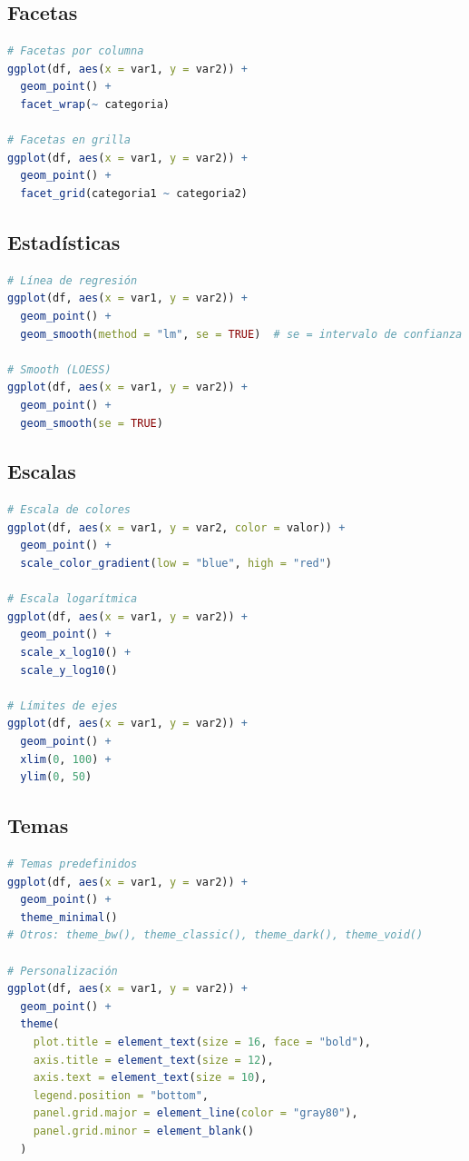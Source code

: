 \documentclass[a4paper,11pt]{article}
\begin{document}
\subsection{Facetas}

\begin{lstlisting}[language=R]
# Facetas por columna
ggplot(df, aes(x = var1, y = var2)) +
  geom_point() +
  facet_wrap(~ categoria)

# Facetas en grilla
ggplot(df, aes(x = var1, y = var2)) +
  geom_point() +
  facet_grid(categoria1 ~ categoria2)
\end{lstlisting}

\subsection{Estadísticas}

\begin{lstlisting}[language=R]
# Línea de regresión
ggplot(df, aes(x = var1, y = var2)) +
  geom_point() +
  geom_smooth(method = "lm", se = TRUE)  # se = intervalo de confianza

# Smooth (LOESS)
ggplot(df, aes(x = var1, y = var2)) +
  geom_point() +
  geom_smooth(se = TRUE)
\end{lstlisting}

\subsection{Escalas}

\begin{lstlisting}[language=R]
# Escala de colores
ggplot(df, aes(x = var1, y = var2, color = valor)) +
  geom_point() +
  scale_color_gradient(low = "blue", high = "red")

# Escala logarítmica
ggplot(df, aes(x = var1, y = var2)) +
  geom_point() +
  scale_x_log10() +
  scale_y_log10()

# Límites de ejes
ggplot(df, aes(x = var1, y = var2)) +
  geom_point() +
  xlim(0, 100) +
  ylim(0, 50)
\end{lstlisting}

\subsection{Temas}

\begin{lstlisting}[language=R]
# Temas predefinidos
ggplot(df, aes(x = var1, y = var2)) +
  geom_point() +
  theme_minimal()
# Otros: theme_bw(), theme_classic(), theme_dark(), theme_void()

# Personalización
ggplot(df, aes(x = var1, y = var2)) +
  geom_point() +
  theme(
    plot.title = element_text(size = 16, face = "bold"),
    axis.title = element_text(size = 12),
    axis.text = element_text(size = 10),
    legend.position = "bottom",
    panel.grid.major = element_line(color = "gray80"),
    panel.grid.minor = element_blank()
  )
\end{lstlisting}
\end{document}
